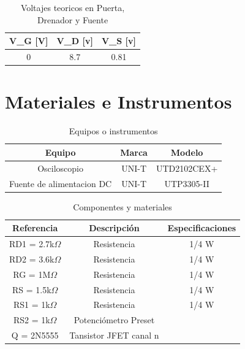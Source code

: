 \documentclass[12pt, a4paper]{article}
\begin{document}
    \begin{table}[h!]
        \centering
        \caption{Voltajes teoricos en Puerta, Drenador y Fuente}
        \label{tab:vteorico} 
        \begin{tabular}{|c|c|c|} \hline
            V_G [V] & V_D [v] & V_S [v] \\ \hline
            0 & 8.7 & 0.81 \\ \hline
        \end{tabular}
    \end{table}

    \newpage

    \section{Materiales e Instrumentos}

    \begin{table}[h!]
        \centering
        \caption{Equipos o instrumentos}
        \label{tab:instrumentos}
        \begin{tabular}{|c|c|c|} \hline
            Equipo                    &  Marca&    Modelo   \\ \hline
            Osciloscopio              &  UNI-T & UTD2102CEX+ \\ 
            Fuente de alimentacion DC  &  UNI-T & UTP3305-II  \\ \hline
        \end{tabular}
    \end{table}

    \begin{table}[h!]
        \centering
        \caption{Componentes y materiales}
        \label{tab:componentes}
        \begin{tabular}{|c|c|c|} \hline
            Referencia&Descripción&    Especificaciones   \\ \hline
                  RD1 = 2.7k$\Omega$   & Resistencia   &          1/4 W         \\
                  RD2 = 3.6k$\Omega$   & Resistencia   &          1/4 W         \\
                  RG = 1M$\Omega$   & Resistencia &  1/4 W         \\
                  RS =  1.5k$\Omega$  &Resistencia  &         1/4 W         \\
                  RS1 = 1k$\Omega$   &Resistencia   &         1/4 W         \\
                  RS2 = 1k$\Omega$             &Potenciómetro Preset&  \\
            Q = 2N5555  &Tansistor JFET canal n &   \\ \hline
            \end{tabular}
            
    \end{table}
\end{document}
